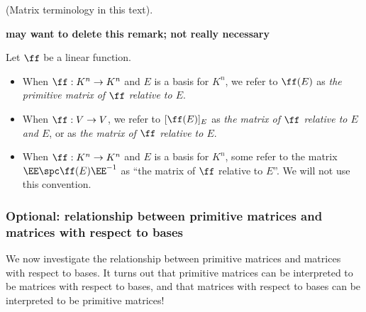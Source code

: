 \begin{remark}
    (Matrix terminology in this text).
    
    \textbf{may want to delete this remark; not really necessary}
    
    Let $\ff$ be a linear function.
    
    \begin{itemize}
        \item When $\ff:K^n \rightarrow K^n$ and $E$ is a basis for $K^n$, we refer to $\ff(E)$ as \textit{the primitive matrix of $\ff$ relative to $E$}.
        \item When $\ff:V \rightarrow V$, we refer to $[\ff(E)]_E$ as \textit{the matrix of $\ff$ relative to $E$ and $E$}, or as \textit{the matrix of $\ff$ relative to $E$}.
        \item When $\ff:K^n \rightarrow K^n$ and $E$ is a basis for $K^n$, some refer to the matrix $\EE \spc \ff(E) \EE^{-1}$ as ``the matrix of $\ff$ relative to $E$''. We will not use this convention.
    \end{itemize}
\end{remark}

\subsubsection*{Optional: relationship between primitive matrices and matrices with respect to bases}

We now investigate the relationship between primitive matrices and matrices with respect to bases. It turns out that primitive matrices can be interpreted to be matrices with respect to bases, and that matrices with respect to bases can be interpreted to be primitive matrices!

